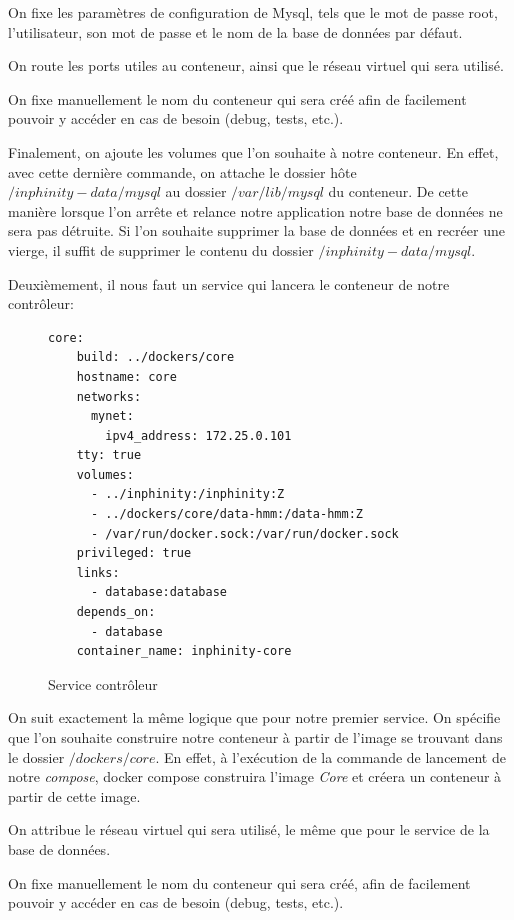 On fixe les paramètres de configuration de Mysql, tels que le mot de passe root, l'utilisateur, son mot de passe et le nom de la base de données par défaut.

On route les ports utiles au conteneur, ainsi que le réseau virtuel qui sera utilisé.

On fixe manuellement le nom du conteneur qui sera créé afin de facilement pouvoir y accéder en cas de besoin (debug, tests, etc.).

Finalement, on ajoute les volumes que l'on souhaite à notre conteneur. En effet, avec cette dernière commande, on attache le dossier hôte \emph{$/inphinity-data/mysql$} au dossier \emph{$/var/lib/mysql$} du conteneur. De cette manière lorsque l'on arrête et relance notre application notre base de données ne sera pas détruite. Si l'on souhaite supprimer la base de données et en recréer une vierge, il suffit de supprimer le contenu du dossier \emph{$/inphinity-data/mysql$}.

\newpage
Deuxièmement, il nous faut un service qui lancera le conteneur de notre contrôleur:

\begin{figure}[H] 
\centering 
\begin{lstlisting}[frame=single]
core:
    build: ../dockers/core
    hostname: core
    networks:
      mynet:
        ipv4_address: 172.25.0.101
    tty: true
    volumes:
      - ../inphinity:/inphinity:Z
      - ../dockers/core/data-hmm:/data-hmm:Z
      - /var/run/docker.sock:/var/run/docker.sock
    privileged: true
    links:
      - database:database
    depends_on:
      - database
    container_name: inphinity-core
\end{lstlisting}
\caption[Service contrôleur]{Service contrôleur}
\label{fig:serviceCore} 
\end{figure}

On suit exactement la même logique que pour notre premier service. On spécifie que l'on souhaite construire notre conteneur à partir de l'image se trouvant dans le dossier \emph{$/dockers/core$}. En effet, à l'exécution de la commande de lancement de notre \emph{compose}, docker compose construira l'image \emph{Core} et créera un conteneur à partir de cette image.

On attribue le réseau virtuel qui sera utilisé, le même que pour le service de la base de données.

On fixe manuellement le nom du conteneur qui sera créé, afin de facilement pouvoir y accéder en cas de besoin (debug, tests, etc.).

